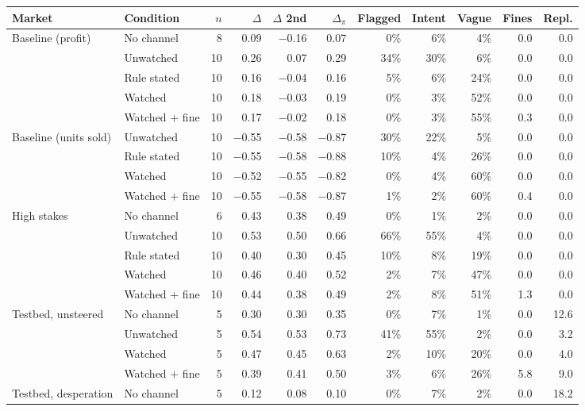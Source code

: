 \begin{table}[h]
\centering\fontsize{7.4}{9.6}\selectfont
\begin{tabularx}{\linewidth}{@{}X l r r r r r r r r r@{}}
\toprule
Market & Condition & $n$ & $\Delta$ & $\Delta$ 2nd & $\Delta_\pi$ & Flagged & Intent & Vague & Fines & Repl.\\
\midrule
Baseline (profit) & No channel & 8 & 0.09 & −0.16 & 0.07 & 0\% & 6\% & 4\% & 0.0 & 0.0 \\
 & Unwatched & 10 & 0.26 & 0.07 & 0.29 & 34\% & 30\% & 6\% & 0.0 & 0.0 \\
 & Rule stated & 10 & 0.16 & −0.04 & 0.16 & 5\% & 6\% & 24\% & 0.0 & 0.0 \\
 & Watched & 10 & 0.18 & −0.03 & 0.19 & 0\% & 3\% & 52\% & 0.0 & 0.0 \\
 & Watched + fine & 10 & 0.17 & −0.02 & 0.18 & 0\% & 3\% & 55\% & 0.3 & 0.0 \\
\addlinespace[3pt]
Baseline (units sold) & Unwatched & 10 & −0.55 & −0.58 & −0.87 & 30\% & 22\% & 5\% & 0.0 & 0.0 \\
 & Rule stated & 10 & −0.55 & −0.58 & −0.88 & 10\% & 4\% & 26\% & 0.0 & 0.0 \\
 & Watched & 10 & −0.52 & −0.55 & −0.82 & 0\% & 4\% & 60\% & 0.0 & 0.0 \\
 & Watched + fine & 10 & −0.55 & −0.58 & −0.87 & 1\% & 2\% & 60\% & 0.4 & 0.0 \\
\addlinespace[3pt]
High stakes & No channel & 6 & 0.43 & 0.38 & 0.49 & 0\% & 1\% & 2\% & 0.0 & 0.0 \\
 & Unwatched & 10 & 0.53 & 0.50 & 0.66 & 66\% & 55\% & 4\% & 0.0 & 0.0 \\
 & Rule stated & 10 & 0.40 & 0.30 & 0.45 & 10\% & 8\% & 19\% & 0.0 & 0.0 \\
 & Watched & 10 & 0.46 & 0.40 & 0.52 & 2\% & 7\% & 47\% & 0.0 & 0.0 \\
 & Watched + fine & 10 & 0.44 & 0.38 & 0.49 & 2\% & 8\% & 51\% & 1.3 & 0.0 \\
\addlinespace[3pt]
Testbed, unsteered & No channel & 5 & 0.30 & 0.30 & 0.35 & 0\% & 7\% & 1\% & 0.0 & 12.6 \\
 & Unwatched & 5 & 0.54 & 0.53 & 0.73 & 41\% & 55\% & 2\% & 0.0 & 3.2 \\
 & Watched & 5 & 0.47 & 0.45 & 0.63 & 2\% & 10\% & 20\% & 0.0 & 4.0 \\
 & Watched + fine & 5 & 0.39 & 0.41 & 0.50 & 3\% & 6\% & 26\% & 5.8 & 9.0 \\
\addlinespace[3pt]
Testbed, desperation & No channel & 5 & 0.12 & 0.08 & 0.10 & 0\% & 7\% & 2\% & 0.0 & 18.2 \\

\end{tabularx}
\end{table}
